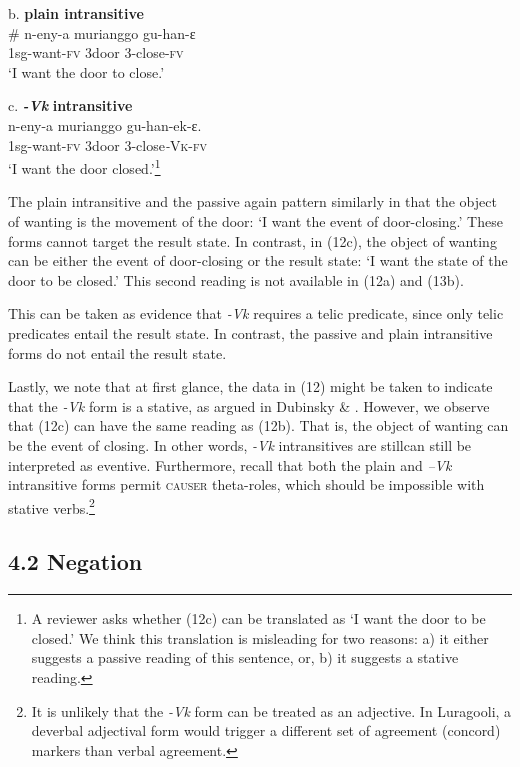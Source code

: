 \documentclass[output=paper]{langsci/langscibook}
\begin{document}
\ea
{b. \textbf{plain intransitive}}\\
\gll \# n-eny-a       murianggo gu-han-ɛ\\
     \textit{  }1sg-want-\textsc{fv} 3door        3-close-\textsc{fv}\\
\glt ‘I want the door to close.’
\z

\ea
{c. \textbf{\textit{{}-Vk }}\textbf{intransitive}}\\
\gll n-eny-a         murianggo gu-han-ek-ɛ.\\
     \textit{  }1sg-want-\textsc{fv} 3door        3-close\textit{{}-}\textsc{Vk}{}-\textsc{fv}\\
\glt ‘I want the door closed.’\footnote{ A reviewer asks whether (12c) can be translated as ‘I want the door to be closed.’ We think this translation is misleading for two reasons: a) it either suggests a passive reading of this sentence, or, b) it suggests a stative reading.}
\z

The plain intransitive and the passive again pattern similarly in that the object of wanting is the movement of the door: ‘I want the event of door-closing.’ These forms cannot target the result state. In contrast, in (12c), the object of wanting can be either the event of door-closing or the result state: ‘I want the state of the door to be closed.’ This second reading is not available in (12a) and (13b).

  This can be taken as evidence that \textit{{}-Vk} requires a telic predicate, since only telic predicates entail the result state. In contrast, the passive and plain intransitive forms do not entail the result state. 

Lastly, we note that at first glance, the data in (12) might be taken to indicate that the \textit{{}-Vk} form is a stative, as argued in Dubinsky \& \citet{Simango1996}. However, we observe that (12c) can have the same reading as (12b). That is, the object of wanting can be the event of closing. In other words, \textit{{}-Vk} intransitives are stillcan still be interpreted as eventive. Furthermore, recall that both the plain and \textit{–Vk }intransitive forms permit \textsc{causer} theta-roles, which should be impossible with stative verbs.\footnote{It is unlikely that the \textit{{}-Vk} form can be treated as an adjective. In Luragooli, a deverbal adjectival form would trigger a different set of agreement (concord) markers than verbal agreement.}

\subsection{4.2 Negation} 
\end{document}
